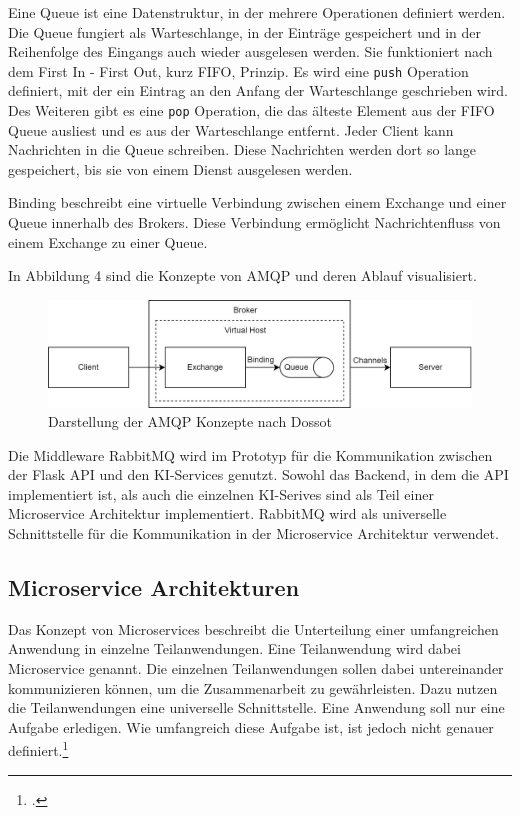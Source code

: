 Eine Queue ist eine Datenstruktur, in der mehrere Operationen definiert werden. Die Queue fungiert als Warteschlange, in der Einträge gespeichert und in der Reihenfolge des Eingangs auch wieder ausgelesen werden. Sie funktioniert nach dem First In - First Out, kurz FIFO, Prinzip. Es wird eine \texttt{push} Operation definiert, mit der ein Eintrag an den Anfang der Warteschlange geschrieben wird. Des Weiteren gibt es eine \texttt{pop} Operation, die das älteste Element aus der FIFO Queue ausliest und es aus der Warteschlange entfernt. Jeder Client kann Nachrichten in die Queue schreiben. Diese Nachrichten werden dort so lange gespeichert, bis sie von einem Dienst ausgelesen werden. 

Binding beschreibt eine virtuelle Verbindung zwischen einem Exchange und einer Queue innerhalb des Brokers. Diese Verbindung ermöglicht Nachrichtenfluss von einem Exchange zu einer Queue.

In Abbildung 4 sind die Konzepte von AMQP und deren Ablauf visualisiert.

\begin{figure}[H]
  \centering
    \includegraphics[width = 15cm]{bilder/Rabbit4}
    \caption{Darstellung der AMQP Konzepte nach Dossot}
\end{figure}


Die Middleware RabbitMQ wird im Prototyp für die Kommunikation zwischen der Flask API und den KI-Services genutzt. Sowohl das Backend, in dem die API implementiert ist, als auch die einzelnen KI-Serives sind als Teil einer Microservice Architektur implementiert. RabbitMQ wird als universelle Schnittstelle für die Kommunikation in der Microservice Architektur verwendet. 

\subsection{Microservice Architekturen}
Das Konzept von Microservices beschreibt die Unterteilung einer umfangreichen Anwendung in einzelne Teilanwendungen. Eine Teilanwendung wird dabei Microservice genannt. Die einzelnen Teilanwendungen sollen dabei untereinander kommunizieren können, um die Zusammenarbeit zu gewährleisten. Dazu nutzen die Teilanwendungen eine universelle Schnittstelle. Eine Anwendung soll nur eine Aufgabe erledigen. Wie umfangreich diese Aufgabe ist, ist jedoch nicht genauer definiert.\footcite{wolff2018microservices}

